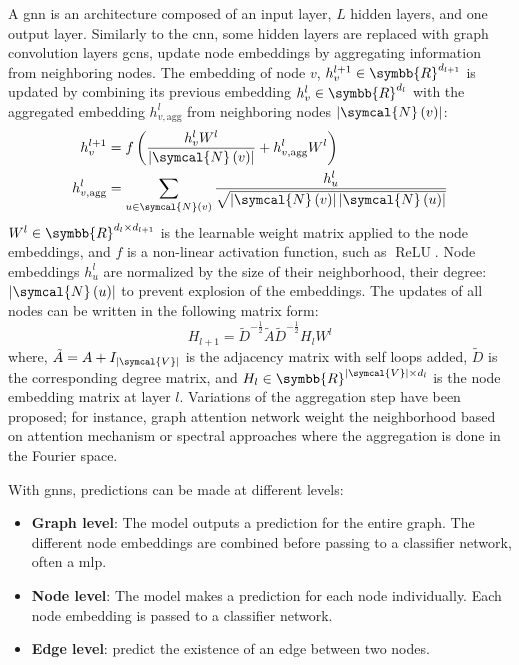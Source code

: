 \documentclass[../main.tex]{subfiles}
\begin{document}
	 A \gls{gnn} is an architecture composed of an input layer, \(L\) hidden layers, and one output layer.
	 Similarly to the \gls{cnn}, some hidden layers are replaced with graph convolution layers
	 \Glspl{gcn}, update node embeddings by aggregating information from neighboring nodes.
	 The embedding of node \(v\), \(h^{l+1}_{v} \in \symbb{R}^{d_{l+1}}\) is updated by combining its previous embedding \(h^{l}_{v} \in \symbb{R}^{d_{l}}\) with the aggregated embedding \(h^{l}_{v,\text{agg}}\) from neighboring nodes \(\left|\symcal{N}\left(v\right) \right|\):
	 \begin{align}
		 h^{l+1}_{v}          & = f\left( \frac{h^{l}_{v}W^{l}}{\left|\symcal{N}\left(v\right) \right|} + h^{l}_{v,\text{agg}}W^{l}\right)                                    \\
		 h^{l}_{v,\text{agg}} & = \sum_{u \in \symcal{N}\left(v\right)} \frac{h^{l}_{u}}{\sqrt{\left|\symcal{N}\left(v\right) \right|\left|\symcal{N}\left(u\right) \right|}}
	 \end{align}
	 \(W^{l} \in \symbb{R}^{d_{l}\times d_{l+1}}\) is the learnable weight matrix applied to the node embeddings, and \(f\) is a non-linear activation function, such as \(\operatorname{ReLU}\).
	 Node embeddings \(h_{u}^{l}\) are normalized by the size of their neighborhood, \ie{}their degree: \(\left|\symcal{N}\left(u\right) \right|\) to prevent explosion of the embeddings.
	 The updates of all nodes can be written in the following matrix form:
	 \begin{equation}
		 H_{l+1} = \tilde{D}^{-\tfrac12}\tilde{A}\tilde{D}^{-\tfrac12}H_{l}W^{l}
	 \end{equation}
	 where, \(\tilde{A} = A + I_{\left|\symcal{V}\right|}\) is the adjacency matrix with self loops added, \(\tilde{D}\) is the corresponding degree matrix, and \(H_{l} \in \symbb{R}^{\left|\symcal{V}\right| \times d_{l}}\) is the node embedding matrix at layer \(l\).
	 Variations of the aggregation step have been proposed; for instance, graph attention network weight the neighborhood based on attention mechanism or spectral approaches where the aggregation is done in the Fourier space.

	 With \glspl{gnn}, predictions can be made at different levels:
	 \begin{itemize}[nosep]
		 \item \textbf{Graph level}: The model outputs a prediction for the entire graph.
		       The different node embeddings are combined before passing to a classifier network, often a \gls{mlp}.
		 \item \textbf{Node level}: The model makes a prediction for each node individually.
		       Each node embedding is passed to a classifier network.
		 \item \textbf{Edge level}: predict the existence of an edge between two nodes.
	 \end{itemize}
\end{document}
